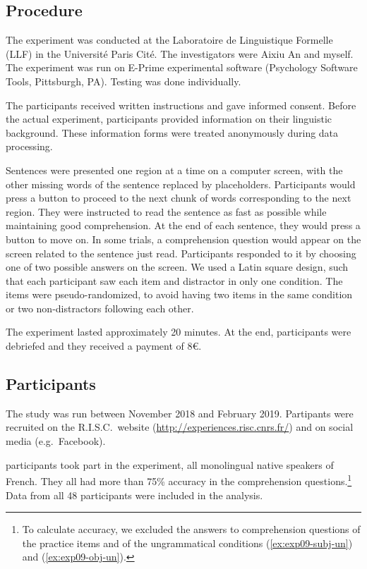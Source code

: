 \subsection{Procedure} 

The experiment was conducted at the Laboratoire de Linguistique Formelle (LLF) in the Université Paris Cité. The investigators were Aixiu An and myself. The experiment was run on E-Prime experimental software (Psychology Software Tools, Pittsburgh, PA). Testing was done individually.

The participants received written instructions and gave informed consent. Before the actual experiment, participants provided information on their linguistic background. These information forms were treated anonymously during data processing.

Sentences were presented one region at a time on a computer screen, with the other missing words of the sentence replaced by placeholders. Participants would press a button to proceed to the next chunk of words corresponding to the next region. They were instructed to read the sentence as fast as possible while maintaining good comprehension. At the end of each sentence, they would press a button to move on. 
In some trials, a comprehension question would appear on the screen related to the sentence just read. Participants responded to it by choosing one of two possible answers on the screen. 
We used a Latin square design, such that each participant saw each item and distractor in only one condition.
The items were pseudo-randomized, to avoid having two items in the same condition or two non-distractors following each other.

The experiment lasted approximately 20 minutes. At the end, participants were debriefed and they received a payment of 8€.


\subsection{Participants}

The study was run between November 2018 and February 2019.  
Partipants were recruited on the R.I.S.C.\ website (\url{http://experiences.risc.cnrs.fr/}) and on social media (e.g.\ Facebook). 

 participants took part in the experiment, all monolingual native speakers of French. They all had more than 75\% accuracy in the comprehension questions.\footnote{To calculate accuracy, we excluded the answers to comprehension questions of the practice items and of the ungrammatical conditions (\ref{ex:exp09-subj-un}) and (\ref{ex:exp09-obj-un}).} Data from all 48 participants were included in the analysis.

